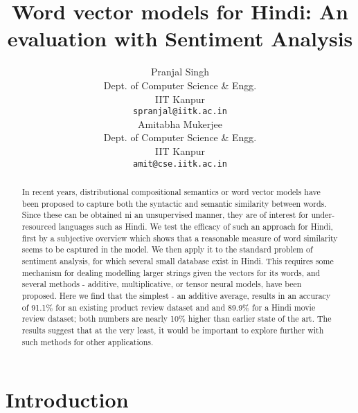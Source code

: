 \documentclass[11pt]{article}
\title{Word vector models for Hindi: An evaluation with Sentiment Analysis}
\author{Pranjal Singh \\
  Dept. of Computer Science \& Engg. \\
  IIT Kanpur \\
  {\tt spranjal@iitk.ac.in} \\\And
  Amitabha Mukerjee \\
  Dept. of Computer Science \& Engg. \\
  IIT Kanpur \\
  {\tt amit@cse.iitk.ac.in} \\}
\date{}
\begin{document}
\maketitle
\begin{abstract}

In recent years, distributional compositional semantics or word vector models
have been proposed to capture both the syntactic and semantic similarity
between words.  Since these can be obtained ni an unsupervised manner, they
are of interest for under-resourced languages such as Hindi.  We test the
efficacy of such an approach for Hindi, first by a subjective overview which
shows that a reasonable measure of word similarity seems to be captured in
the model.  We then apply it to the standard problem of sentiment analysis,
for which several small database exist in Hindi.  This requires some
mechanism for dealing modelling larger strings given the vectors for its
words, and several methods - additive, multiplicative, or tensor neural
models, have been proposed.  Here we find that the simplest - an additive
average, results in an accuracy of 91.1\% for an existing product review
dataset and and 89.9\% for a Hindi movie review dataset; both numbers are
nearly 10\% higher than earlier state of the art.  The results suggest that
at the very least, it would be important to explore further with such methods
for other applications.
 
\end{abstract}


\section{Introduction}
\end{document}
